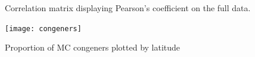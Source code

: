 \begin{figure}[!ht]
\caption{Correlation matrix displaying Pearson's coefficient on the full data.}
\label{fig:matrixfull}
\end{figure}


\begin{figure}[!ht]
  \texttt{[image: congeners]}
    \caption{Proportion of MC congeners plotted by latitude}
  \label{congenerlat}
\end{figure}

